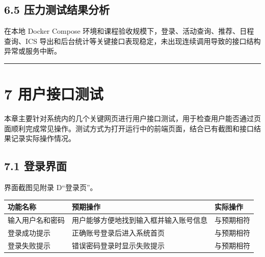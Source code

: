 \subsection{6.5
压力测试结果分析}\label{ux538bux529bux6d4bux8bd5ux7ed3ux679cux5206ux6790}

在本地 Docker Compose
环境和课程验收规模下，登录、活动查询、推荐、日程查询、ICS
导出和后台统计等关键接口表现稳定，未出现连续调用导致的接口结构异常或服务中断。

\begin{center}\rule{0.5\linewidth}{0.5pt}\end{center}

\section{7 用户接口测试}\label{ux7528ux6237ux63a5ux53e3ux6d4bux8bd5}

本章主要针对系统内的几个关键网页进行用户接口测试，用于检查用户能否通过页面顺利完成常见操作。测试方式为打开运行中的前端页面，结合已有截图和接口结果记录实际操作情况。

\subsection{7.1 登录界面}\label{ux767bux5f55ux754cux9762}

界面截图见附录 D``登录页''。

{\def\LTcaptype{none} %
\begin{longtable}[]{@{}|
  >{\raggedright\arraybackslash}p{}|
  >{\raggedright\arraybackslash}p{}|
  >{\raggedright\arraybackslash}p{}|@{}}
\hline
\rowcolor{gray!12}
\begin{minipage}[b]{\linewidth}\raggedright
\bfseries 功能名称
\end{minipage} & \begin{minipage}[b]{\linewidth}\raggedright
\bfseries 预期操作
\end{minipage} & \begin{minipage}[b]{\linewidth}\raggedright
\bfseries 实际操作
\end{minipage} \\
\hline
\endhead
\hline
\endlastfoot
输入用户名和密码 & 用户能够方便地找到输入框并输入账号信息 &
与预期相符 \\
\hline
登录成功提示 & 正确账号登录后进入系统首页 & 与预期相符 \\
\hline
登录失败提示 & 错误密码登录时显示失败提示 & 与预期相符 \\
\hline
\end{longtable}
}

